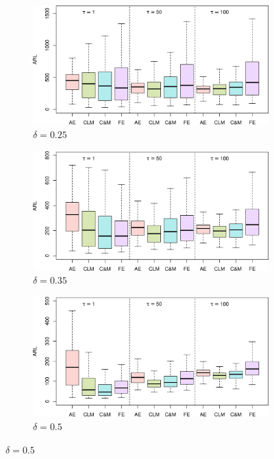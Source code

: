 \begin{figure}
\centering
\begin{subfigure}{0.49\textwidth}
  \centering
  \caption{$ \delta = 0.25$}
  \label{fig:lambda=0.10/theta=4.0/delta=0.25}
  \includegraphics[width=\textwidth]{img/sims/theta=4.0_signedEWMA(l = 0.1, upw = true, L = 1.0)/delta=0.25.png}
\end{subfigure}
\begin{subfigure}{0.49\textwidth}
  \centering
  \caption{$ \delta = 0.35$}
  \label{fig:lambda=0.10/theta=4.0/delta=0.35}
  \includegraphics[width=\textwidth]{img/sims/theta=4.0_signedEWMA(l = 0.1, upw = true, L = 1.0)/delta=0.35.png}
\end{subfigure}
\begin{subfigure}{0.49\textwidth}
  \centering
  \caption{$ \delta = 0.5$}
  \label{fig:lambda=0.10/theta=4.0/delta=0.5}
  \includegraphics[width=\textwidth]{img/sims/theta=4.0_signedEWMA(l = 0.1, upw = true, L = 1.0)/delta=0.50.png}

\end{subfigure}
\end{figure}
